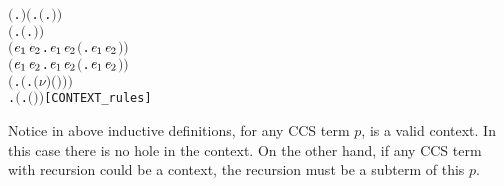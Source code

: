 \begin{alltt}
\HOLTokenTurnstile{}  \ensuremath{(}\HOLTokenLambda{}. \ensuremath{)} \HOLSymConst{\HOLTokenConj{}} \ensuremath{(}\HOLSymConst{\HOLTokenForall{}}.  \ensuremath{(}\HOLTokenLambda{}. \ensuremath{)}\ensuremath{)} \HOLSymConst{\HOLTokenConj{}}
   \ensuremath{(}\HOLSymConst{\HOLTokenForall{}} .   \HOLSymConst{\HOLTokenImp{}}  \ensuremath{(}\HOLTokenLambda{}. \HOLSymConst{\ensuremath{\ldotp}} \ensuremath{)}\ensuremath{)} \HOLSymConst{\HOLTokenConj{}}
   \ensuremath{(}\HOLSymConst{\HOLTokenForall{}}\ensuremath{\HOLBoundVar{e}\sb{\mathrm{1}}} \ensuremath{\HOLBoundVar{e}\sb{\mathrm{2}}}.  \ensuremath{\HOLBoundVar{e}\sb{\mathrm{1}}} \HOLSymConst{\HOLTokenConj{}}  \ensuremath{\HOLBoundVar{e}\sb{\mathrm{2}}} \HOLSymConst{\HOLTokenImp{}}  \ensuremath{(}\HOLTokenLambda{}. \ensuremath{\HOLBoundVar{e}\sb{\mathrm{1}}}  \HOLSymConst{\ensuremath{+}} \ensuremath{\HOLBoundVar{e}\sb{\mathrm{2}}} \ensuremath{)}\ensuremath{)} \HOLSymConst{\HOLTokenConj{}}
   \ensuremath{(}\HOLSymConst{\HOLTokenForall{}}\ensuremath{\HOLBoundVar{e}\sb{\mathrm{1}}} \ensuremath{\HOLBoundVar{e}\sb{\mathrm{2}}}.  \ensuremath{\HOLBoundVar{e}\sb{\mathrm{1}}} \HOLSymConst{\HOLTokenConj{}}  \ensuremath{\HOLBoundVar{e}\sb{\mathrm{2}}} \HOLSymConst{\HOLTokenImp{}}  \ensuremath{(}\HOLTokenLambda{}. \ensuremath{\HOLBoundVar{e}\sb{\mathrm{1}}}  \HOLSymConst{\ensuremath{\mid}} \ensuremath{\HOLBoundVar{e}\sb{\mathrm{2}}} \ensuremath{)}\ensuremath{)} \HOLSymConst{\HOLTokenConj{}}
   \ensuremath{(}\HOLSymConst{\HOLTokenForall{}} .   \HOLSymConst{\HOLTokenImp{}}  \ensuremath{(}\HOLTokenLambda{}. \ensuremath{(\nu}\ensuremath{)} \ensuremath{(} \ensuremath{)}\ensuremath{)}\ensuremath{)} \HOLSymConst{\HOLTokenConj{}}
   \HOLSymConst{\HOLTokenForall{}} .   \HOLSymConst{\HOLTokenImp{}}  \ensuremath{(}\HOLTokenLambda{}.  \ensuremath{(} \ensuremath{)} \ensuremath{)}\hfill{[CONTEXT_rules]}
\end{alltt}
Notice in above inductive definitions, for any CCS term $p$,
 is a valid context. In this case there is no
hole in the context. On the other hand, if any CCS term with recursion
could be a context, the recursion must be a subterm of this $p$.

